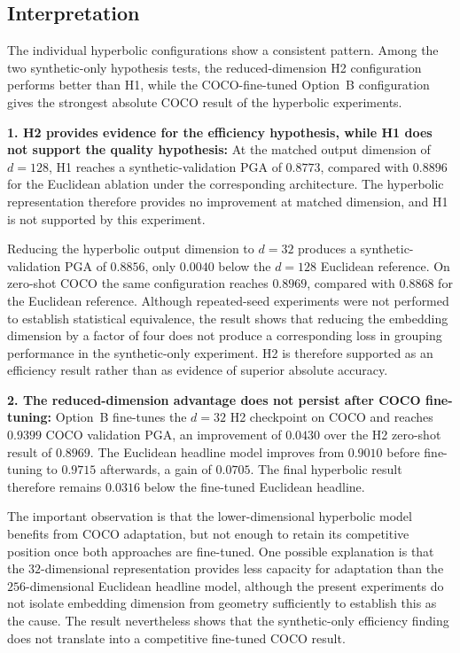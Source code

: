 \subsection{Interpretation}
\label{sec_res_hyperbolic_discussion}

The individual hyperbolic configurations show a consistent pattern.
Among the two synthetic-only hypothesis tests,
the reduced-dimension H2 configuration performs better than H1,
while the COCO-fine-tuned Option~B configuration gives the strongest
absolute COCO result of the hyperbolic experiments.

\textbf{1. H2 provides evidence for the efficiency hypothesis, while
H1 does not support the quality hypothesis:}
At the matched output dimension of $d=128$,
H1 reaches a synthetic-validation PGA of $0.8773$,
compared with $0.8896$ for the Euclidean ablation under the
corresponding architecture.
The hyperbolic representation therefore provides no improvement
at matched dimension,
and H1 is not supported by this experiment.

Reducing the hyperbolic output dimension to $d=32$ produces a
synthetic-validation PGA of $0.8856$,
only $0.0040$ below the $d=128$ Euclidean reference.
On zero-shot COCO the same configuration reaches $0.8969$,
compared with $0.8868$ for the Euclidean reference.
Although repeated-seed experiments were not performed to establish
statistical equivalence,
the result shows that reducing the embedding dimension by a factor
of four does not produce a corresponding loss in grouping performance
in the synthetic-only experiment.
H2 is therefore supported as an efficiency result
rather than as evidence of superior absolute accuracy.

\textbf{2. The reduced-dimension advantage does not persist after
COCO fine-tuning:}
Option~B fine-tunes the $d=32$ H2 checkpoint on COCO and reaches
$0.9399$ COCO validation PGA,
an improvement of $0.0430$ over the H2 zero-shot result of $0.8969$.
The Euclidean headline model improves from $0.9010$ before fine-tuning
to $0.9715$ afterwards,
a gain of $0.0705$.
The final hyperbolic result therefore remains $0.0316$ below the
fine-tuned Euclidean headline.

The important observation is that the lower-dimensional hyperbolic
model benefits from COCO adaptation,
but not enough to retain its competitive position once both approaches
are fine-tuned.
One possible explanation is that the $32$-dimensional representation
provides less capacity for adaptation than the $256$-dimensional
Euclidean headline model,
although the present experiments do not isolate embedding dimension
from geometry sufficiently to establish this as the cause.
The result nevertheless shows that the synthetic-only efficiency
finding does not translate into a competitive fine-tuned COCO result.

